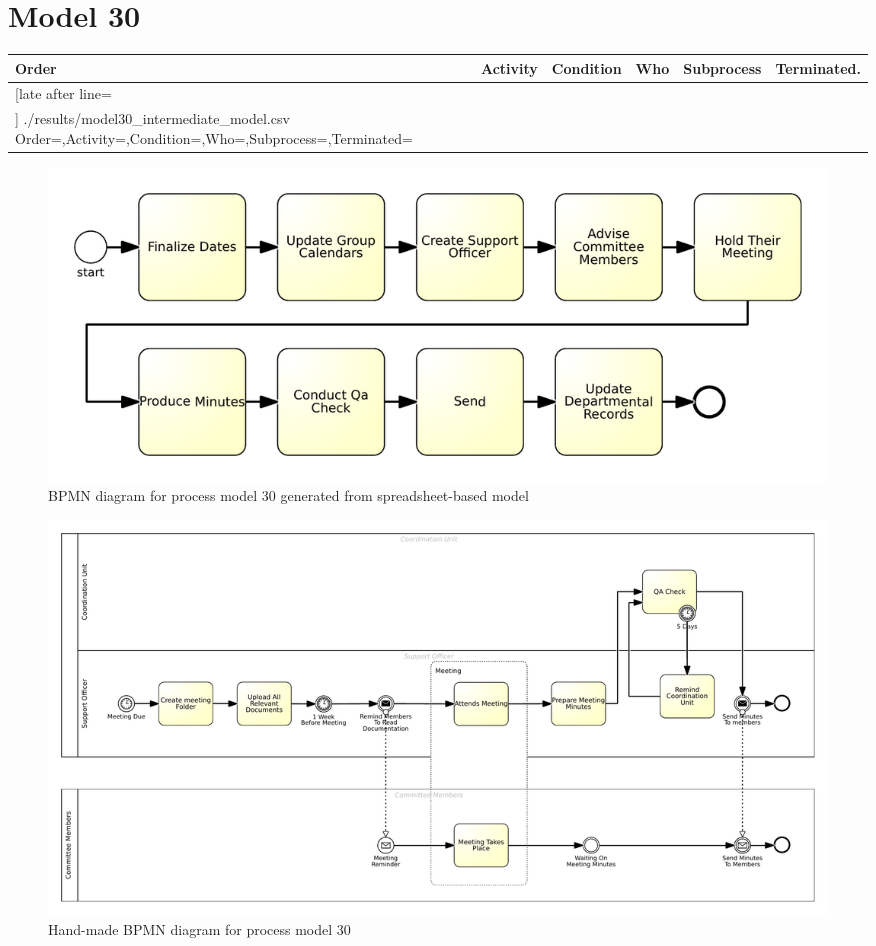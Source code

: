\section{Model 30}
\begin{tcolorbox}[
	breakable,
	arc=0mm,
	left=1pt,
	right = 1pt,
	boxrule=0mm,
	colback = {white},
	]
	\texttt{}
\end{tcolorbox}
\label{txt:model30}

{\scriptsize
	\begin{longtable}{|p{0.03 \hsize}|p{0.25 \hsize}|p{0.15 \hsize}|p{0.2 \hsize}|p{0.1 \hsize}|p{0.1 \hsize}|}
		\hline
		Order & Activity & Condition & Who & Subprocess & Terminated.
		\\\hline\hline
		\csvreader[late after line=\\\hline]
		{./results/model30_intermediate_model.csv}
		{Order=\Order,Activity=\Activity,Condition=\Condition,Who=\Who,Subprocess=\Subprocess,Terminated=\Terminated}
		{\Order & \Activity & \Condition & \Who & \Subprocess & \Terminated}
		\caption{Spreadsheet-based description for process model 30}
		\label{csv:model30}
	\end{longtable}
}

\begin{figure}[H]
	\centering
	\includegraphics[width=\hsize]{./generated_bpmn/model30.pdf}
	\caption{BPMN diagram for process model 30 generated from spreadsheet-based model}
	\label{bpmn:generated_model30}
\end{figure}

\begin{figure}[H]
	\centering
	\includegraphics[width=\hsize]{./bpmn/model30.pdf}
	\caption{Hand-made BPMN diagram for process model 30}
	\label{bpmn:model30}
\end{figure}

